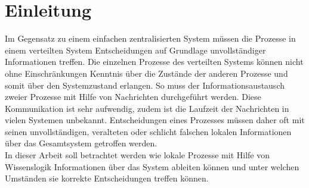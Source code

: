 \section{Einleitung}
Im Gegensatz zu einem einfachen zentralisierten System müssen die Prozesse in einem verteilten System Entscheidungen auf Grundlage unvollständiger Informationen treffen.
Die einzelnen Prozesse des verteilten Systems können nicht ohne Einschränkungen Kenntnis über die Zustände der anderen Prozesse und somit über den Systemzustand erlangen.
So muss der Informationsaustausch zweier Prozesse mit Hilfe von Nachrichten durchgeführt werden. Diese Kommunikation ist sehr aufwendig, zudem ist die Laufzeit der Nachrichten in vielen Systemen unbekannt.
Entscheidungen eines Prozesses müssen daher oft mit seinen unvollständigen, veralteten oder schlicht falschen lokalen Informationen über das Gesamtsystem getroffen werden.\\
In dieser Arbeit soll betrachtet werden wie lokale Prozesse mit Hilfe von Wissenslogik Informationen über das System ableiten können und unter welchen Umständen sie korrekte Entscheidungen treffen können.

